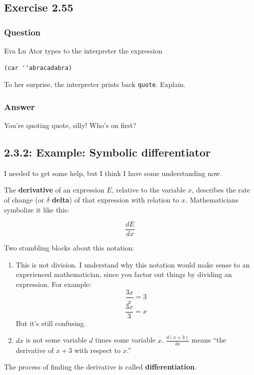\documentclass[final,fleqn,titlepage,twoside]{article}
\begin{document}
\subsection{Exercise 2.55}
\label{sec:orgf953830}
\subsubsection{Question}
\label{sec:org995a8ad}
Eva Lu Ator types to the interpreter the expression

\begin{verbatim}
(car ''abracadabra)
\end{verbatim}

To her surprise, the interpreter prints back \texttt{quote}. Explain.

\subsubsection{Answer}
\label{sec:org41a1fb8}
You're quoting quote, silly! Who's on first?

\subsection{2.3.2: Example: Symbolic differentiator}
\label{sec:orgd597c64}
I needed to get some help, but I think I have some understanding now.

The \textbf{derivative} of an expression \(E\), relative to the variable \(x\),
describes the rate of change (or \(\delta\) \textbf{delta}) of that expression with
relation to \(x\). Mathematicians symbolize it like this:

\[\frac{dE}{dx}\]

Two stumbling blocks about this notation:
\begin{enumerate}
\item This is not division. I understand why this notation would make sense to an
experienced mathematician, since you factor out things by dividing an
expression. For example:
\[\frac{3x}{x} = 3\]
\[\frac{3x}{3} = x\]
But it's still confusing.
\item \(dx\) is not some variable \(d\) times some variable \(x\).
\(\frac{d(x+3)}{dx}\) means ``the derivative of \(x+3\) with respect to
\(x\).''
\end{enumerate}

The process of finding the derivative is called \textbf{differentiation}.
\end{document}

